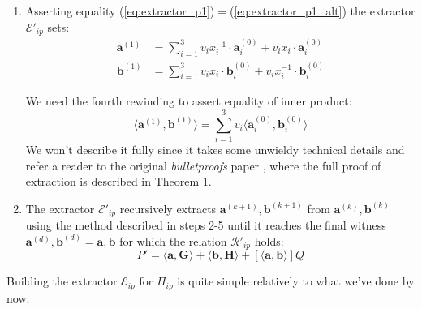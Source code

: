\documentclass[../lecture-notes-148x210.tex]{subfiles}
\begin{document}
\begin{enumerate}
\begin{equation}
            \label{eq:extractor_p1_alt}
        \end{equation}
    \item Asserting equality (\ref{eq:extractor_p1})$=$(\ref{eq:extractor_p1_alt}) the extractor $\mathcal{E}'_{ip}$ sets: 
        \begin{align}
            \mathbf{a}^{(1)} &= \sum_{i=1}^3 v_i x_i^{-1} \cdot \mathbf{a}_i^{(0)} + v_i x_i \cdot \mathbf{a}_i^{(0)} \\
            \mathbf{b}^{(1)} &= \sum_{i=1}^3 v_i x_i \cdot \mathbf{b}_i^{(0)} + v_i x_i^{-1} \cdot \mathbf{b}_i^{(0)}
        \end{align}    
    
        We need the fourth rewinding to assert equality of inner product: 
        $$\langle \mathbf{a}^{(1)}, \mathbf{b}^{(1)} \rangle = \sum_{i=1}^3 v_i \langle \mathbf{a}_i^{(0)}, \mathbf{b}_i^{(0)} \rangle$$
        We won't describe it fully since it takes some unwieldy technical details and refer a reader to the original \textit{bulletproofs} paper \cite{bulletproofs}, where the full proof of extraction is described in Theorem 1.
    \item The extractor $\mathcal{E}'_{ip}$ recursively extracts $\mathbf{a}^{(k+1)}, \mathbf{b}^{(k+1)}$ from $ \mathbf{a}^{(k)}, \mathbf{b}^{(k)}$ using the method described in steps 2-5 until it reaches the final witness $\mathbf{a}^{(d)}, \mathbf{b}^{(d)} = \mathbf{a}, \mathbf{b}$ for which the relation $\mathcal{R}'_{ip}$ holds: 
    $$P' =  \langle \mathbf{a,G} \rangle + \langle \mathbf{b,H} \rangle + [\langle \mathbf{a,b} \rangle]Q$$
\end{enumerate}
Building the extractor $\mathcal{E}_{ip}$ for $\Pi_{ip}$ is quite simple relatively to what we've done by now:
\end{document}
